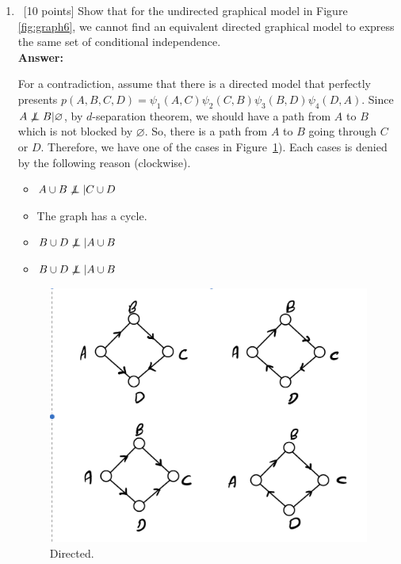 \documentclass[12pt, fullpage,letterpaper]{article}
\def\red{\color{black!30!red}}
\def\blackblue{\color{black!40!blue}}
\newcommand\independent{\protect\mathpalette{\protect\independenT}{\perp}}
\def\independenT#1#2{\mathrel{\rlap{$#1#2$}\mkern2mu{#1#2}}}
\begin{document}
\begin{enumerate}
\begin{enumerate}
\item~[10 points] Show that for the undirected graphical model in Figure \ref{fig:graph6}, we cannot find an equivalent directed graphical model to express the same set of conditional independence. \\
{\bf \red Answer: }{\blackblue 
For a contradiction, assume that there is a directed model that perfectly presents $p(A, B, C, D) = \psi_1(A, C)\psi_2(C, B)\psi_3(B, D)\psi_4(D, A)$.
Since $A\not\independent B|\varnothing$, by $d$-separation theorem, we should have a path from $A$ to $B$ which is not blocked by $\varnothing$. 
So, there is a path from $A$ to $B$ going through $C$ or $D$. Therefore, we have one of the cases in Figure~\ref{fig:graph10}). 
Each cases is denied by the following reason (clockwise).
\begin{itemize}
\item $A\cup B\not \independent|C\cup D$
\item The graph has a cycle.
\item $B\cup D\not \independent|A\cup B$
\item $B\cup D\not \independent|A\cup B$
\end{itemize}
\begin{figure}[h]
	\centering
	\includegraphics[width=0.4\linewidth]{FigQ10.png} 
	\caption{Directed.} \label{fig:graph10}
\end{figure}

}
\end{enumerate}


\end{enumerate}
\end{document}
